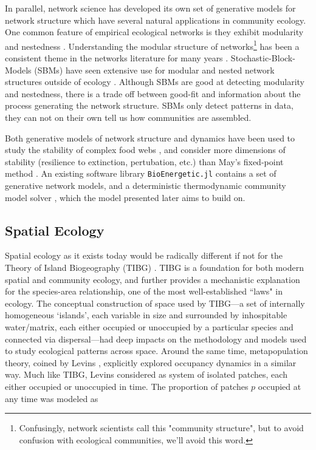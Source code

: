 \documentclass[]{article}
\begin{document}
In parallel, network science has developed its own set of generative models for network structure which have several natural applications in community ecology.
One common feature of empirical ecological networks is they exhibit modularity and nestedness \cite{bascompte_nested_2003,bascompte_asymmetric_2006,olesen_modularity_2007,neutel_reconciling_2007}. Understanding the modular structure of networks\footnote{Confusingly, network scientists call this "community structure", but to avoid confusion with ecological communities, we'll avoid this word.} has been a consistent theme in the networks literature for many years \citep{clauset_finding_2004,newman_modularity_2006}.
Stochastic-Block-Models (SBMs) have seen extensive use for modular and
nested network structures outside of ecology \cite{hofman_bayesian_2008,good_performance_2010}. Although SBMs are good at detecting modularity and nestedness, there is a trade off between good-fit and information about the process generating the network structure. SBMs only detect patterns in data, they can not on their own tell us how communities are assembled.

Both generative models of network structure and dynamics have been used to study the stability of complex food webs \cite{allesina_stability_2012,allesina_predicting_2015}, and consider more dimensions of stability (resilience to extinction, pertubation, etc.) than May's fixed-point method \cite{dominguez-garcia_unveiling_2019}. An existing software library \texttt{BioEnergetic.jl} contains a set of generative network models, and a deterministic thermodynamic community model solver \citep{delmas_simulations_2017, poisot_ecologicalnetworksjl_2019}, which the model presented later aims to build on.

\hypertarget{spatial-ecology}{%
\subsection{Spatial Ecology}\label{spatial-ecology}}

Spatial ecology as it exists today would be radically different if not
for the Theory of Island Biogeography (TIBG)
\citep{macarthur_theory_2016}. TIBG is a foundation for both
modern spatial and community ecology, and further provides a mechanistic
explanation for the species-area relationship, one of the most
well-established ``laws" in ecology. The conceptual construction of
space used by TIBG---a set of internally homogeneous `islands', each
variable in size and surrounded by inhospitable water/matrix, each
either occupied or unoccupied by a particular species and connected via
dispersal---had deep impacts on the methodology and models used to study
ecological patterns across space. Around the same time, metapopulation
theory, coined by Levins \citep{levins_demographic_1969},
explicitly explored occupancy dynamics in a similar way. Much like TIBG, Levins
considered as system of isolated patches, each either occupied or
unoccupied in time. The proportion of patches \(p\) occupied at any time
was modeled as
\end{document}
